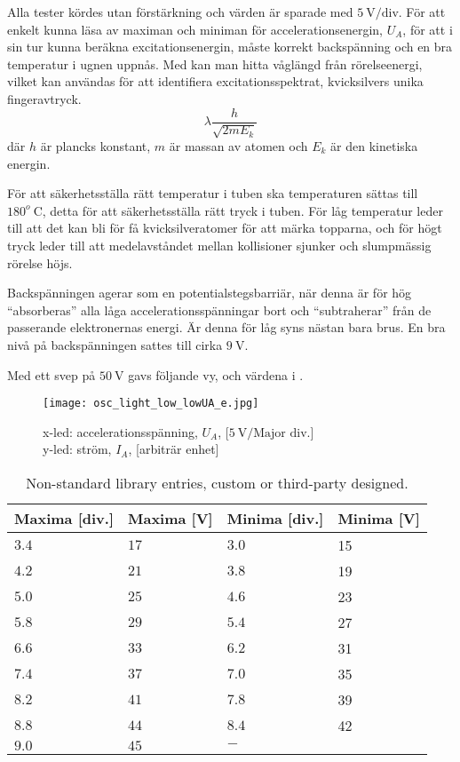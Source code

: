Alla tester kördes utan förstärkning och värden är sparade med $5~\textrm{V/div.}$
För att enkelt kunna läsa av maximan och miniman för accelerationsenergin, $U_A$, för att i sin tur kunna beräkna excitationsenergin, måste korrekt backspänning och en bra temperatur i ugnen uppnås. Med \cite[s. 303]{ph} kan man hitta våglängd från rörelseenergi, vilket kan användas för att identifiera excitationsspektrat, kvicksilvers unika fingeravtryck.
\begin{equation}\label{eq:debrog}
	\lambda \frac{h}{\sqrt{2mE_k}}
\end{equation}
där $h$ är plancks konstant, $m$ är massan av atomen och $E_k$ är den kinetiska energin.

För att säkerhetsställa rätt temperatur i tuben ska temperaturen sättas till $180^o~\textrm{C}$, detta för att säkerhetsställa rätt tryck i tuben. För låg temperatur leder till att det kan bli för få kvicksilveratomer för att märka topparna, och för högt tryck leder till att medelavståndet mellan kollisioner sjunker och slumpmässig rörelse höjs\cite{rochhand}.

Backspänningen agerar som en potentialstegsbarriär, när denna är för hög ``absorberas'' alla låga accelerationsspänningar bort och ``subtraherar'' från de passerande elektronernas energi. Är denna för låg syns nästan bara brus.
En bra nivå på backspänningen sattes till cirka $9~\textrm{V}$.

Med ett svep på $50~\textrm{V}$ gavs följande vy,  och värdena i .
\begin{figure}[h]
	\centering
	\texttt{[image: osc\_light\_low\_lowUA\_e.jpg]}
	\caption{x-led: accelerationsspänning, $U_A$, [$5~\textrm{V/Major div.}$]\\
			y-led: ström, $I_A$, [arbiträr enhet]}
	\label{fig:ollle}
\end{figure}

\begin{minipage}{\linewidth}
\begin{table}[H]
\centering
	\begin{tabular}{llll}
 	\textbf{Maxima [div.]}& \textbf{Maxima [V]}&\textbf{Minima [div.]}& \textbf{Minima [V]}\\\hline
	$3.4$&$17$&$3.0$&15\\
	$4.2$&$21$&$3.8$&19\\
	$5.0$&$25$&$4.6$&23\\
	$5.8$&$29$&$5.4$&27\\
	$6.6$&$33$&$6.2$&31\\
	$7.4$&$37$&$7.0$&35\\
	$8.2$&$41$&$7.8$&39\\
	$8.8$&$44$&$8.4$&42\\
	$9.0$&$45$&$ - $&
 	\end{tabular}
\caption{Non-standard library entries, custom or third-party designed.}
\label{tab:maxmin}
\end{table}
\end{minipage}
\vspace{.5cm}


